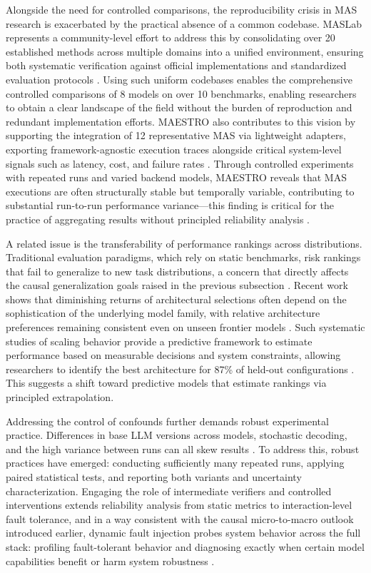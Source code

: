 \documentclass[11pt,a4paper]{article}
\begin{document}
Alongside the need for controlled comparisons, the reproducibility crisis in MAS research is exacerbated by the practical absence of a common codebase. MASLab represents a community-level effort to address this by consolidating over 20 established methods across multiple domains into a unified environment, ensuring both systematic verification against official implementations and standardized evaluation protocols \cite{arxiv:2505.16988v2}. Using such uniform codebases enables the comprehensive controlled comparisons of 8 models on over 10 benchmarks, enabling researchers to obtain a clear landscape of the field without the burden of reproduction and redundant implementation efforts. MAESTRO also contributes to this vision by supporting the integration of 12 representative MAS via lightweight adapters, exporting framework-agnostic execution traces alongside critical system-level signals such as latency, cost, and failure rates \cite{arxiv:2601.00481v1}. Through controlled experiments with repeated runs and varied backend models, MAESTRO reveals that MAS executions are often structurally stable but temporally variable, contributing to substantial run-to-run performance variance---this finding is critical for the practice of aggregating results without principled reliability analysis \cite{arxiv:2601.00481v1}.

A related issue is the transferability of performance rankings across distributions. Traditional evaluation paradigms, which rely on static benchmarks, risk rankings that fail to generalize to new task distributions, a concern that directly affects the causal generalization goals raised in the previous subsection \cite{arxiv:2507.21504v1,arxiv:2503.16416v2,arxiv:2601.00481v1}. Recent work shows that diminishing returns of architectural selections often depend on the sophistication of the underlying model family, with relative architecture preferences remaining consistent even on unseen frontier models \cite{arxiv:2512.08296v3}. Such systematic studies of scaling behavior provide a predictive framework to estimate performance based on measurable decisions and system constraints, allowing researchers to identify the best architecture for 87\% of held-out configurations \cite{arxiv:2512.08296v3}. This suggests a shift toward predictive models that estimate rankings via principled extrapolation.

Addressing the control of confounds further demands robust experimental practice. Differences in base LLM versions across models, stochastic decoding, and the high variance between runs can all skew results \cite{arxiv:2602.03128v1}. To address this, robust practices have emerged: conducting sufficiently many repeated runs, applying paired statistical tests, and reporting both variants and uncertainty characterization. Engaging the role of intermediate verifiers and controlled interventions extends reliability analysis from static metrics to interaction-level fault tolerance, and in a way consistent with the causal micro-to-macro outlook introduced earlier, dynamic fault injection probes system behavior across the full stack: profiling fault-tolerant behavior and diagnosing exactly when certain model capabilities benefit or harm system robustness \cite{arxiv:2603.04474v2,arxiv:2602.19843v1}.
\end{document}
